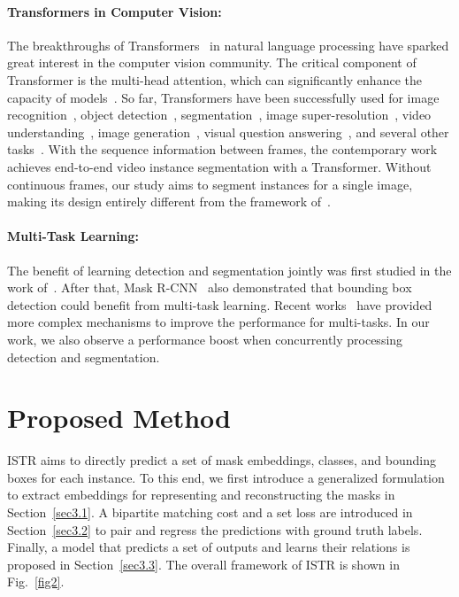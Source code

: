 \documentclass[10pt,twocolumn,letterpaper]{article}
\begin{document}
\paragraph{Transformers in Computer Vision:} The breakthroughs of Transformers~\cite{vaswani2017attention} in natural language processing have sparked great interest in the computer vision community.
The critical component of Transformer is the multi-head attention, which can significantly enhance the capacity of models~\cite{han2020survey,khan2021transformers}.
So far, Transformers have been successfully used for image recognition~\cite{dosovitskiy2020image,touvron2020training}, object detection~\cite{carion2020end,zhu2020deformable,sun2020sparse}, segmentation~\cite{zheng2020rethinking,ye2019cross}, image super-resolution~\cite{yang2020learning}, video understanding~\cite{sun2019videobert,girdhar2019video}, image generation~\cite{chen2020pre,wang2020sceneformer}, visual question answering~\cite{tan2019lxmert,su2019vl}, and several other tasks~\cite{kumar2021colorization,doersch2020crosstransformers,ye2020few}.
With the sequence information between frames, the contemporary work~\cite{wang2020endvideo} achieves end-to-end video instance segmentation with a Transformer.
Without continuous frames, our study aims to segment instances for a single image, making its design entirely different from the framework of~\cite{wang2020endvideo}.
\paragraph{Multi-Task Learning:} The benefit of learning detection and segmentation jointly was first studied in the work of~\cite{hariharan2014simultaneous}.
After that, Mask R-CNN~\cite{he2017mask} also demonstrated that bounding box detection could benefit from multi-task learning.
Recent works~\cite{chen2018masklab,liu2018path,shen2019cyclic,cao2019triply} have provided more complex mechanisms to improve the performance for multi-tasks.
In our work, we also observe a performance boost when concurrently processing detection and segmentation.


\section{Proposed Method}
ISTR aims to directly predict a set of mask embeddings, classes, and bounding boxes for each instance.
To this end, we first introduce a generalized formulation to extract embeddings for representing and reconstructing the masks in Section~\ref{sec3.1}.
A bipartite matching cost and a set loss are introduced in Section~\ref{sec3.2} to pair and regress the predictions with ground truth labels.
Finally, a model that predicts a set of outputs and learns their relations is proposed in Section~\ref{sec3.3}.
The overall framework of ISTR is shown in Fig.~\ref{fig2}.
\end{document}
